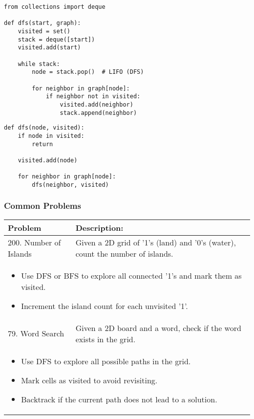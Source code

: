 \begin{algo}
\begin{lstlisting}
from collections import deque

def dfs(start, graph):
    visited = set()
    stack = deque([start])
    visited.add(start)

    while stack:
        node = stack.pop()  # LIFO (DFS)

        for neighbor in graph[node]:
            if neighbor not in visited:
                visited.add(neighbor)
                stack.append(neighbor) 
\end{lstlisting}
    \end{algo}

\begin{algo}
\begin{lstlisting}
def dfs(node, visited):
    if node in visited:
        return

    visited.add(node)

    for neighbor in graph[node]:
        dfs(neighbor, visited)
\end{lstlisting}
\end{algo}

\newpage

\subsubsection{Common Problems}
\begin{summary}
    \begin{center}
        \begin{tabular}{ll}
            \toprule
            \textbf{Problem} & \textbf{Description:} \\
            \midrule
            200. Number of Islands & Given a 2D grid of '1's (land) and '0's (water), count the number of islands. \\
            \multicolumn{2}{p{\linewidth}}{
                \begin{itemize}
                    \item Use DFS or BFS to explore all connected '1's and mark them as visited.
                    \item Increment the island count for each unvisited '1'.
                \end{itemize}
            } \\
            \midrule
            79. Word Search & Given a 2D board and a word, check if the word exists in the grid. \\
            \multicolumn{2}{p{\linewidth}}{
                \begin{itemize}
                    \item Use DFS to explore all possible paths in the grid.
                    \item Mark cells as visited to avoid revisiting.
                    \item Backtrack if the current path does not lead to a solution.
                \end{itemize}
            } \\
        \end{tabular}
    \end{center}
\end{summary}